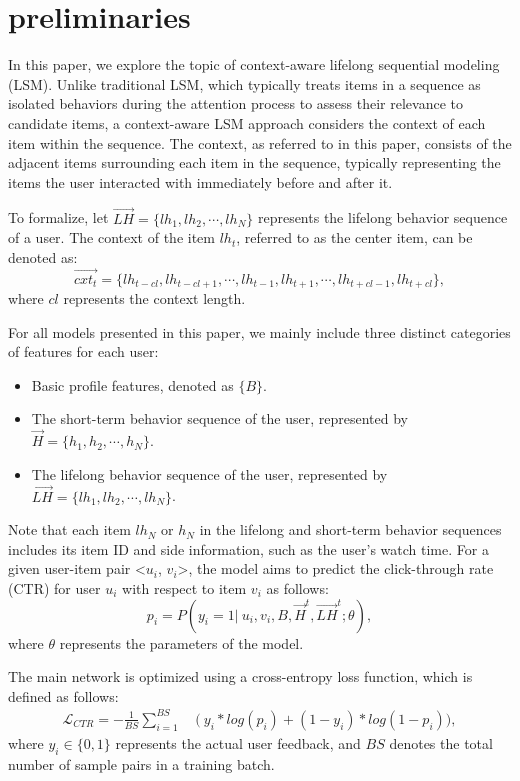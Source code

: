 \section{preliminaries}

In this paper, we explore the topic of context-aware lifelong sequential modeling (LSM). Unlike traditional LSM, which typically treats items in a sequence as isolated behaviors during the attention process to assess their relevance to candidate items, a context-aware LSM approach considers the context of each item within the sequence. The context, as referred to in this paper, consists of the adjacent items surrounding each item in the sequence, typically representing the items the user interacted with immediately before and after it.

To formalize, let $\vec{LH} = \{ lh_1, lh_2, \cdots, lh_{N} \}$ represents the lifelong behavior sequence of a user. The context of the item $lh_{t}$, referred to as the center item, can be denoted as:
\begin{equation} 
    \vec{cxt_t} = \{ lh_{t-cl}, lh_{t-cl+1}, \cdots, lh_{t-1}, lh_{t+1}, \cdots, lh_{t+cl-1}, lh_{t+cl} \},
\label{eq:context}
\end{equation}
where $cl$ represents the context length.

For all models presented in this paper, we mainly include three distinct categories of features for each user:

\begin{itemize}
 \item Basic profile features, denoted as ${\{B\}}$. 
 \item The short-term behavior sequence of the user, represented by $\vec{H} = \{ h_1, h_2, \cdots, h_{N} \}$. 
 \item The lifelong behavior sequence of the user, represented by $\vec{LH} = \{ lh_1, lh_2, \cdots, lh_{N} \}$. 
\end{itemize}

Note that each item $lh_{N}$ or $h_N$ in the lifelong and short-term behavior sequences includes its item ID and side information, such as the user's watch time. For a given user-item pair <$u_{i}$, $v_{i}$>, the model aims to predict the click-through rate (CTR) for user $u_{i}$ with respect to item $v_{i}$ as follows:
\begin{equation} 
    p_{i} = P(y_i=1|~u_{i},v_{i},B,\vec{H}^{t},\vec{LH}^{t};\theta),
\label{eq:target}
\end{equation}
where $\theta$ represents the parameters of the model.

The main network is optimized using a cross-entropy loss function, which is defined as follows:
\begin{equation}
\begin{split}
    \mathcal{L}_{CTR} = - \frac{1}{BS} \sum_{i=1}^{BS} & ~ \Big(~ y_i*log(p_i) + (1-y_i)*log(1-p_i) \Big),
\end{split}
\label{eq:cross_entropy}
\end{equation}
where $y_{i} \in \{0, 1\}$ represents the actual user feedback, and $BS$ denotes the total number of sample pairs in a training batch. 
